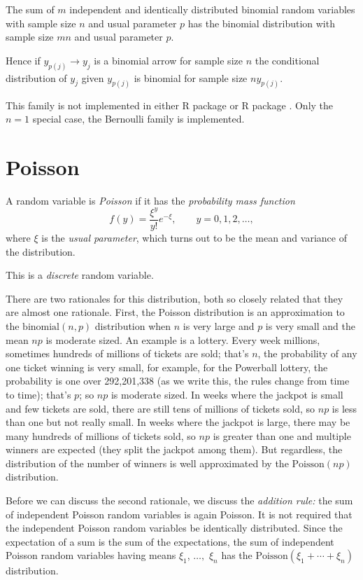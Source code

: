 The sum of $m$ independent and identically distributed
binomial random variables with sample size $n$ and usual parameter $p$
has the binomial distribution with sample size $m n$ and usual parameter $p$.

Hence if $y_{p(j)} \longrightarrow y_j$ is a binomial arrow for sample size $n$
the conditional distribution of $y_j$ given $y_{p(j)}$ is binomial
for sample size $n y_{p(j)}$.

This family is not implemented in either R package  or
R package .  Only the $n = 1$ special case, the Bernoulli
family is implemented.

\section{Poisson}
\label{sec:poisson}

A random variable is \emph{Poisson} if it has
the \emph{probability mass function}
\begin{equation} \label{eq:poisson-pmf}
   f(y) = \frac{\xi^y}{y !} e^{- \xi}, \qquad y = 0, 1, 2, \ldots,
\end{equation}
where $\xi$ is the \emph{usual parameter}, which turns out to be the
mean and variance of the distribution.

This is a \emph{discrete} random variable.

There are two rationales for this distribution, both so closely related
that they are almost one rationale.  First, the Poisson distribution is
an approximation to the $\text{binomial}(n, p)$ distribution when $n$
is very large and $p$ is very small and the mean $n p$ is moderate sized.
An example is a lottery.  Every week millions, sometimes hundreds of millions
of tickets are sold; that's $n$, the probability of any one ticket winning
is very small, for example, for the Powerball lottery, the probability is
one over 292,201,338 (as we write this, the rules change from time to time);
that's $p$; so $n p$ is moderate sized.  In weeks where the jackpot is small
and few tickets are sold, there are still tens of millions of tickets sold,
so $n p$ is less than one but not really small.  In weeks where the jackpot
is large, there may be many hundreds of millions
of tickets sold, so $n p$ is greater
than one and multiple winners are expected (they split the jackpot among them).
But regardless, the distribution of the number of winners is well approximated
by the $\text{Poisson}(n p)$ distribution.

Before we can discuss the second rationale, we discuss the \emph{addition rule:}
the sum of independent Poisson random variables is again Poisson.
It is not required that the independent Poisson random variables be
identically distributed.  Since the expectation of a sum is the sum of the
expectations, the sum of independent Poisson random variables having
means $\xi_1$, $\ldots,$ $\xi_n$ has
the $\text{Poisson}(\xi_1 + \cdots + \xi_n)$ distribution.

